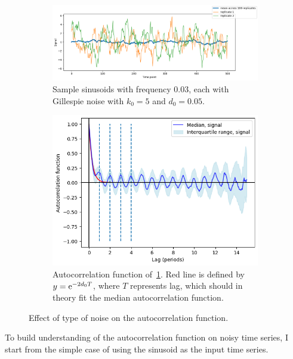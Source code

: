 \begin{figure}
  \begin{subfigure}[t]{0.45\textwidth}
  \centering
    \includegraphics[width=\linewidth]{gillespie_k5_d0p05_mean}
    \caption{
      Sample sinusoids with frequency 0.03, each with Gillespie noise with $k_{0} = 5$ and $d_{0} = 0.05$.
    }
    \label{fig:acf-sinusoids-gillnoise-ts}
  \end{subfigure}%
  \centering
  \begin{subfigure}[t]{0.45\textwidth}
  \centering
    \includegraphics[width=\linewidth]{gillespie_k5_d0p05_acf}
    \caption{
      Autocorrelation function of~\ref{fig:acf-sinusoids-gillnoise-ts}.
      Red line is defined by $y = \mathrm{e}^{-2d_{0}T}$, where $T$ represents lag, which should in theory fit the median autocorrelation function.
    }
    \label{fig:acf-sinusoids-gillnoise-acf}
  \end{subfigure}

  \caption{
    Effect of type of noise on the autocorrelation function.
  }
  \label{fig:acf-sinusoids}
\end{figure}

To build understanding of the autocorrelation function on noisy time series, I start from the simple case of using the sinusoid as the input time series.

